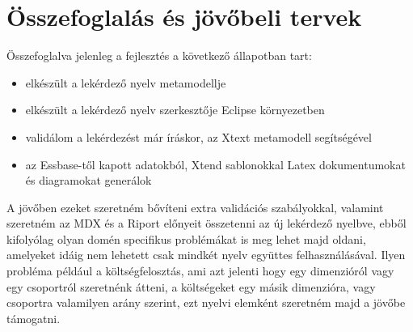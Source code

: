 \chapter{Összefoglalás és jövőbeli tervek}\label{sect:Summary}
Összefoglalva jelenleg a fejlesztés a következő állapotban tart:
\begin{itemize}
  \item elkészült a lekérdező nyelv metamodellje
  \item elkészült a lekérdező nyelv szerkesztője Eclipse környezetben
  \item validálom a lekérdezést már íráskor, az Xtext metamodell segítségével
  \item az Essbase-től kapott adatokból, Xtend sablonokkal Latex dokumentumokat és diagramokat generálok
\end{itemize}

A jövőben ezeket szeretném bővíteni extra validációs szabályokkal, valamint szeretném az MDX és a Riport előnyeit összetenni az új lekérdező nyelbve, ebből kifolyólag olyan domén specifikus problémákat is meg lehet majd oldani, amelyeket idáig nem lehetett csak mindkét nyelv együttes felhasználásával. Ilyen probléma például a költségfelosztás, ami azt jelenti hogy egy dimenzióról vagy egy csoportról szeretnénk átteni, a költségeket egy másik dimenzióra, vagy csoportra valamilyen arány szerint, ezt nyelvi elemként szeretném majd a jövőbe támogatni.
